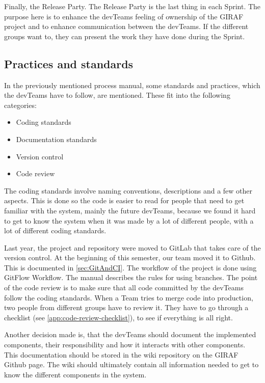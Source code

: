 Finally, the Release Party. The Release Party is the last thing in each Sprint. The purpose here is to enhance the \glspl{devTeam} feeling of ownership of the GIRAF project and to enhance communication between the \glspl{devTeam}. If the different groups want to, they can present the work they have done during the Sprint.

\subsection{Practices and standards}

In the previously mentioned process manual, some standards and practices, which the \glspl{devTeam} have to follow, are mentioned. These fit into the following categories:

\begin{itemize}
    \item Coding standards
    \item Documentation standards
    \item Version control
    \item Code review
\end{itemize}

The coding standards involve naming conventions, descriptions and a few other aspects. This is done so the code is easier to read for people that need to get familiar with the system, mainly the future \glspl{devTeam}, because we found it hard to get to know the system when it was made by a lot of different people, with a lot of different coding standards.

Last year, the project and repository were moved to GitLab that takes care of the version control. At the beginning of this semester, our team moved it to Github. This is documented in \autoref{sec:GitAndCI}. The workflow of the project is done using GitFlow Workflow. The manual describes the rules for using branches. The point of the code review is to make sure that all code committed by the \glspl{devTeam} follow the coding standards. When a Team tries to merge code into production, two people from different groups have to review it. They have to go through a checklist (see \autoref{app:code-review-checklist}), to see if everything is all right.

Another decision made is, that the \glspl{devTeam} should document the implemented components, their responsibility and how it interacts with other components. This documentation should be stored in the wiki repository on the GIRAF Github page. The wiki should ultimately contain all information needed to get to know the different components in the system.

